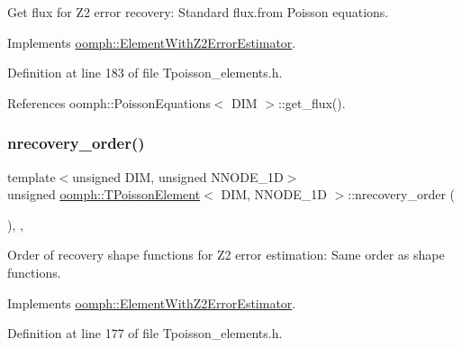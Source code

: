 Get \textquotesingle{}flux\textquotesingle{} for Z2 error recovery\+: Standard flux.\+from Poisson equations. 



Implements \hyperlink{classoomph_1_1ElementWithZ2ErrorEstimator_a5688ff5f546d81771cabad82ca5a7556}{oomph\+::\+Element\+With\+Z2\+Error\+Estimator}.



Definition at line 183 of file Tpoisson\+\_\+elements.\+h.



References oomph\+::\+Poisson\+Equations$<$ D\+I\+M $>$\+::get\+\_\+flux().

\mbox{\label{classoomph_1_1TPoissonElement_af9b5501d7aba59f31b9030e57d997af9}} 
\subsubsection{\texorpdfstring{nrecovery\+\_\+order()}{nrecovery\_order()}}
{\footnotesize\ttfamily template$<$unsigned D\+IM, unsigned N\+N\+O\+D\+E\+\_\+1D$>$ \\
unsigned \hyperlink{classoomph_1_1TPoissonElement}{oomph\+::\+T\+Poisson\+Element}$<$ D\+IM, N\+N\+O\+D\+E\+\_\+1D $>$\+::nrecovery\+\_\+order (\begin{DoxyParamCaption}{ }\end{DoxyParamCaption})\hspace{0.3cm}{\ttfamily [inline]}, {\ttfamily [protected]}, {\ttfamily [virtual]}}



Order of recovery shape functions for Z2 error estimation\+: Same order as shape functions. 



Implements \hyperlink{classoomph_1_1ElementWithZ2ErrorEstimator_af39480835bd3e0f6b2f4f7a9a4044798}{oomph\+::\+Element\+With\+Z2\+Error\+Estimator}.



Definition at line 177 of file Tpoisson\+\_\+elements.\+h.

\mbox{\label{classoomph_1_1TPoissonElement_a73f3da4bd164baf56515f2244769a199}} 
